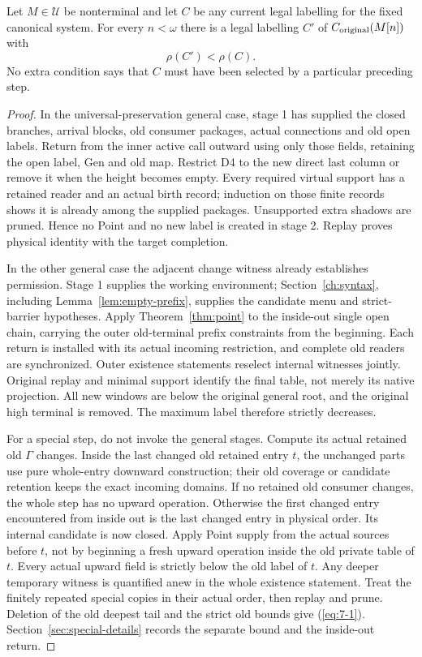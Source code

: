 \begin{theorem}\label{thm:descent}
Let $M\in\mathscr U$ be nonterminal and let $C$ be any current legal
labelling for the fixed canonical system. For every $n<\omega$
there is a legal labelling $C'$ of $C_{\rm original}(M[n])$ with
\begin{equation}\label{eq:7-1}
                              \rho(C')<\rho(C).             
\end{equation}
No extra condition says that $C$ must have been selected by a
particular preceding step.
\end{theorem}
\begin{proof}
In the universal-preservation general case, stage 1 has supplied
the closed branches, arrival blocks, old consumer packages, actual
connections and old open labels. Return from the inner active call
outward using only those fields, retaining the open label, Gen and
old map. Restrict D4 to the new direct last column or remove it
when the height becomes empty. Every required virtual support has
a retained reader and an actual birth record; induction on those
finite records shows it is already among the supplied packages.
Unsupported extra shadows are pruned. Hence no Point and no new
label is created in stage 2. Replay proves physical identity with
the target completion. 

In the other general case the adjacent change witness already
establishes permission. Stage 1 supplies the working environment;
Section~\ref{ch:syntax}, including Lemma~\ref{lem:empty-prefix},
supplies the candidate menu and strict-barrier hypotheses. Apply
Theorem~\ref{thm:point} to the inside-out single open chain, carrying
the outer old-terminal prefix constraints from the beginning.
Each return is installed with its actual incoming restriction,
and complete old readers are synchronized. Outer existence
statements reselect internal witnesses jointly. Original replay
and minimal support identify the final table, not merely its
native projection. All new windows are below the original general
root, and the original high terminal is removed. The maximum label
therefore strictly decreases.

For a special step, do not invoke the general stages. Compute its
actual retained old $\Gamma$ changes. Inside the last changed old
retained entry $t$, the unchanged parts use pure whole-entry
downward construction; their old coverage or candidate retention
keeps the exact incoming domains. If no retained old consumer
changes, the whole step has no upward operation. Otherwise the
first changed entry encountered from inside out is the last
changed entry in physical order. Its internal candidate is now
closed. Apply Point supply from the actual sources before $t$,
not by beginning a fresh upward operation inside the old private
table of $t$. Every actual upward field is strictly below the
old label of $t$. Any deeper temporary witness is quantified anew
in the whole existence statement. Treat the finitely repeated
special copies in their actual order, then replay and prune.
Deletion of the old deepest tail and the strict old bounds give
(\ref{eq:7-1}). Section~\ref{sec:special-details} records the separate bound and
the inside-out return.


\end{proof}
